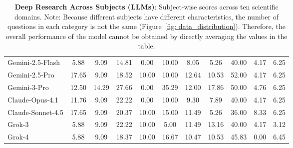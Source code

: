 \begin{table}[t]
{\begin{tabular}{lcccccccccc}
Gemini-2.5-Flash & 5.88 & 9.09 & 14.81 & 0.00 & 10.00 & 8.05 & 5.26 & 40.00 & 4.17 & 6.25 \\
Gemini-2.5-Pro & 17.65 & 9.09 & 18.52 & 10.00 & 10.00 & 12.64 & 10.53 & 52.00 & 4.17 & 6.25 \\
Gemini-3-Pro & 12.50 & 14.29 & 27.66 & 0.00 & 35.29 & 12.00 & 17.86 & 50.00 & 4.76 & 6.25 \\
Claude-Opus-4.1 & 11.76 & 9.09 & 22.22 & 0.00 & 10.00 & 9.30 & 7.89 & 40.00 & 4.17 & 6.25 \\
Claude-Sonnet-4.5 & 17.65 & 9.09 & 20.37 & 10.00 & 15.00 & 11.49 & 5.26 & 36.00 & 8.33 & 6.25 \\
Grok-3 & 5.88 & 9.09 & 22.22 & 10.00 & 5.00 & 11.49 & 13.16 & 40.00 & 4.17 & 3.12 \\
Grok-4 & 5.88 & 9.09 & 18.37 & 10.00 & 16.67 & 10.47 & 10.53 & 45.83 & 0.00 & 6.45 \\
\bottomrule
\end{tabular}
}
\caption{\textbf{Deep Research Across Subjects (LLMs)}: Subject-wise scores across ten scientific domains. Note: Because different subjects have different characteristics, the number of questions in each category is not the same (Figure~\ref{fig: data_distribution}). Therefore, the overall performance of the model cannot be obtained by directly averaging the values in the table.}
\label{tab:llms_deep_research_subject_metric_table}
\end{table}

